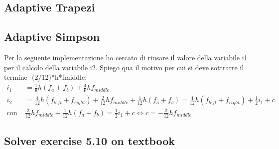 \subsection{Adaptive Trapezi}
\label{subsec:adaptiveTrapezi}


\subsection{Adaptive Simpson}
\label{subsec:adaptiveSimpson}
Per la seguente implementazione ho cercato di riusare il valore della variabile
\textsf{i1} per il calcolo della variabile \textsf{i2}. Spiego qua il motivo
per cui si deve sottrarre il termine \textsf{-(2/12)*h*fmiddle}:
\begin{displaymath}
\begin{split}
i_{1} &= \frac{1}{6}h(f_{a} + f_{b}) + \frac{4}{6}hf_{middle}\\
i_{2} &= \frac{4}{12}h(f_{left} + f_{right}) + \frac{2}{12}hf_{middle} +
\frac{1}{12}h(f_{a} + f_{b}) = \frac{4}{12}h(f_{left} + f_{right}) +
\frac{1}{2}i_{1} + c\\
\text{con } & \frac{2}{12}hf_{middle} + \frac{1}{12}h(f_{a} + f_{b}) =
\frac{1}{2}i_{1} + c \Leftrightarrow c = -\frac{2}{12}hf_{middle}
\end{split}
\end{displaymath}


\subsection{Solver exercise 5.10 on textbook}
\label{subsec:exercise510solver}
